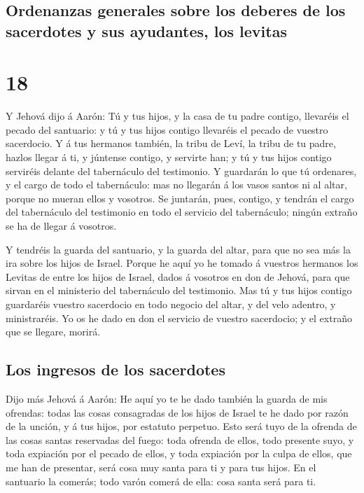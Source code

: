 \hypertarget{ordenanzas-generales-sobre-los-deberes-de-los-sacerdotes-y-sus-ayudantes-los-levitas}{%
\subsection{Ordenanzas generales sobre los deberes de los sacerdotes y
sus ayudantes, los
levitas}\label{ordenanzas-generales-sobre-los-deberes-de-los-sacerdotes-y-sus-ayudantes-los-levitas}}

\hypertarget{section-04-18}{%
\section{18}\label{section-04-18}}

 Y Jehová dijo á Aarón: Tú y tus hijos, y la casa de tu
padre contigo, llevaréis el pecado del santuario: y tú y tus hijos
contigo llevaréis el pecado de vuestro sacerdocio.  Y á
tus hermanos también, la tribu de Leví, la tribu de tu padre, hazlos
llegar á ti, y júntense contigo, y servirte han; y tú y tus hijos
contigo serviréis delante del tabernáculo del testimonio. 
Y guardarán lo que tú ordenares, y el cargo de todo el tabernáculo: mas
no llegarán á los vasos santos ni al altar, porque no mueran ellos y
vosotros.  Se juntarán, pues, contigo, y tendrán el cargo
del tabernáculo del testimonio en todo el servicio del tabernáculo;
ningún extraño se ha de llegar á vosotros.

 Y tendréis la guarda del santuario, y la guarda del
altar, para que no sea más la ira sobre los hijos de Israel.
 Porque he aquí yo he tomado á vuestros hermanos los
Levitas de entre los hijos de Israel, dados á vosotros en don de Jehová,
para que sirvan en el ministerio del tabernáculo del testimonio.
 Mas tú y tus hijos contigo guardaréis vuestro sacerdocio
en todo negocio del altar, y del velo adentro, y ministraréis. Yo os he
dado en don el servicio de vuestro sacerdocio; y el extraño que se
llegare, morirá.

\hypertarget{los-ingresos-de-los-sacerdotes}{%
\subsection{Los ingresos de los
sacerdotes}\label{los-ingresos-de-los-sacerdotes}}

 Dijo más Jehová á Aarón: He aquí yo te he dado también la
guarda de mis ofrendas: todas las cosas consagradas de los hijos de
Israel te he dado por razón de la unción, y á tus hijos, por estatuto
perpetuo.  Esto será tuyo de la ofrenda de las cosas
santas reservadas del fuego: toda ofrenda de ellos, todo presente suyo,
y toda expiación por el pecado de ellos, y toda expiación por la culpa
de ellos, que me han de presentar, será cosa muy santa para ti y para
tus hijos.  En el santuario la comerás; todo varón comerá
de ella: cosa santa será para ti.

